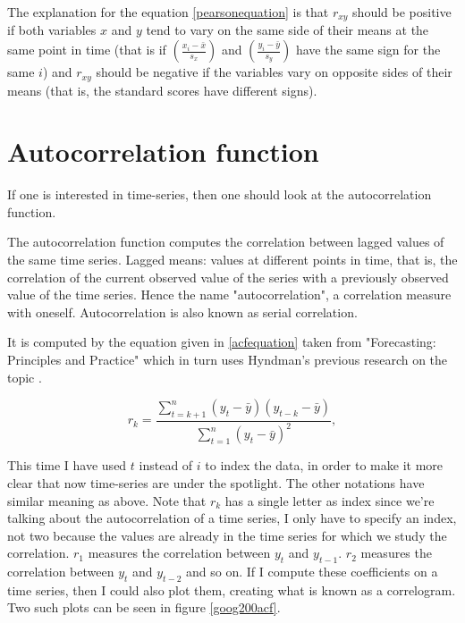 \documentclass[12pt,a4paper,titlepage]{report}
\begin{document}
The explanation for the equation \ref{pearsonequation} is that $ r_{xy} $ should be positive if both variables $ x$ and $ y $ tend to vary on the same side of their means at the same point in time (that is if $ \left(\frac{x_{i}-\bar{x}}{s_{x}}\right) $ and $ \left(\frac{y_{i}-\bar{y}}{s_{y}}\right) $ have the same sign for the same $ i $) and $ r_{xy} $ should be negative if the variables vary on opposite sides of their means (that is, the standard scores have different signs)\cite{nauregression}.

\section{Autocorrelation function} \label{autocorrelationfunctionsection}

If one is interested in time-series, then one should look at the autocorrelation function.

The autocorrelation function computes the correlation between lagged values of the same time series. Lagged means: values at different points in time, that is, the correlation of the current observed value of the series with a previously observed value of the time series. Hence the name "autocorrelation", a correlation measure with oneself. Autocorrelation is also known as serial correlation.

It is computed by the equation given in \ref{acfequation} taken from "Forecasting: Principles and Practice" \cite{fpp2} which in turn uses Hyndman's previous research on the topic \cite{hyndman2015acf}.

\begin{equation}
r_{k} = \frac{\sum\limits_{t=k+1}^{n}(y_{t}-\bar{y})(y_{t-k}-\bar{y})}
{\sum\limits_{t=1}^{n}(y_{t}-\bar{y})^2},
\label{acfequation}
\end{equation}

This time I have used $ t $ instead of $ i $ to index the data, in order to make it more clear that now time-series are under the spotlight. The other notations have similar meaning as above. Note that $ r_{k} $ has a single letter as index since we're talking about the autocorrelation of a time series, I only have to specify an index, not two because the values are already in the time series for which we study the correlation. $ r_{1} $ measures the correlation between $ y_{t} $ and $ y_{t-1} $. $ r_{2} $ measures the correlation between $ y_{t} $ and $ y_{t-2} $ and so on. If I compute these coefficients on a time series, then I could also plot them, creating what is known as a correlogram. Two such plots can be seen in figure \ref{goog200acf}.
\end{document}
